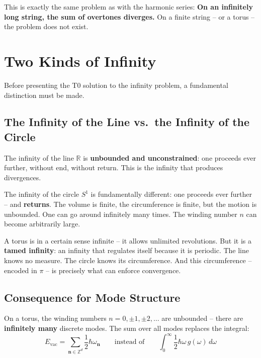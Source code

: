 	This is exactly the same problem as with the harmonic series: \textbf{On an infinitely long string, the sum of overtones diverges.} On a finite string -- or a torus -- the problem does not exist.


	\section{Two Kinds of Infinity}
	
	Before presenting the T0 solution to the infinity problem, a fundamental distinction must be made.
	
	\subsection{The Infinity of the Line vs.\ the Infinity of the Circle}
	
	The infinity of the line $\mathbb{R}$ is \textbf{unbounded and unconstrained}: one proceeds ever further, without end, without return. This is the infinity that produces divergences.
	
	The infinity of the circle $S^1$ is fundamentally different: one proceeds ever further -- and \textbf{returns}. The volume is finite, the circumference is finite, but the motion is unbounded. One can go around infinitely many times. The winding number $n$ can become arbitrarily large.
	
	\begin{keypoint}
		A torus is in a certain sense infinite -- it allows unlimited revolutions. But it is a \textbf{tamed infinity}: an infinity that regulates itself because it is periodic. The line knows no measure. The circle knows its circumference. And this circumference -- encoded in $\pi$ -- is precisely what can enforce convergence.
	\end{keypoint}
	
	\subsection{Consequence for Mode Structure}
	
	On a torus, the winding numbers $n = 0, \pm 1, \pm 2, \ldots$ are unbounded -- there are \textbf{infinitely many} discrete modes. The sum over all modes replaces the integral:
	\begin{equation}
		E_{\text{vac}} = \sum_{\mathbf{n} \in \mathbb{Z}^d} \frac{1}{2} \hbar \omega_{\mathbf{n}} \qquad \text{instead of} \qquad \int_0^{\infty} \frac{1}{2} \hbar \omega \, g(\omega) \, d\omega
	\end{equation}
	
